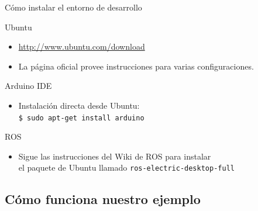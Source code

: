   \begin{frame}{Cómo instalar el entorno de desarrollo}
    \begin{block}{Ubuntu}
      \begin{itemize}
       \item \url{http://www.ubuntu.com/download}
       \item La página oficial provee instrucciones para varias configuraciones.
      \end{itemize}
    \end{block}
    \begin{block}{Arduino IDE}
      \begin{itemize}
       \item Instalación directa desde Ubuntu:\\
             \texttt{\$ sudo apt-get install \alert{arduino}}
      \end{itemize}
    \end{block}
    \begin{block}{ROS}
      \begin{itemize}
       \item Sigue las instrucciones del Wiki de ROS para instalar\\
             el paquete de Ubuntu llamado \alert{\texttt{ros-electric-desktop-full}} 
      \end{itemize}
    \end{block}
  \end{frame}

%
\subsection{Cómo funciona nuestro ejemplo}


